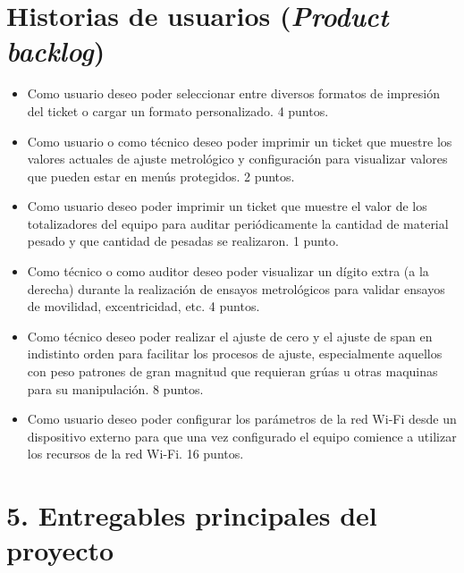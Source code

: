 \documentclass[11pt]{charter}
\begin{document}
\section{Historias de usuarios (\textit{Product backlog})}
\label{sec:backlog}
%
\begin{itemize}
\item Como usuario deseo poder seleccionar entre diversos formatos de impresión del ticket o cargar un formato personalizado. 4 puntos.
\item Como usuario o como técnico deseo poder imprimir un ticket que muestre los valores actuales de ajuste metrológico y configuración para visualizar valores que pueden estar en menús protegidos. 2 puntos.
\item Como usuario deseo poder imprimir un ticket que muestre el valor de los totalizadores del equipo para auditar periódicamente la cantidad de material pesado y que cantidad de pesadas se realizaron. 1 punto.
\item Como técnico o como auditor deseo poder visualizar un dígito extra (a la derecha) durante la realización de ensayos metrológicos para validar ensayos de movilidad, excentricidad, etc. 4 puntos.
\item Como técnico deseo poder realizar el ajuste de cero y el ajuste de span en indistinto orden para facilitar los procesos de ajuste, especialmente aquellos con peso patrones de gran magnitud que requieran grúas u otras maquinas para su manipulación. 8 puntos.
\item Como usuario deseo poder configurar los parámetros de la red Wi-Fi desde un dispositivo externo para que una vez configurado el equipo comience a utilizar los recursos de la red Wi-Fi. 16 puntos.

\end{itemize}

\section{5. Entregables principales del proyecto}
\label{sec:entregables}
\end{document}
